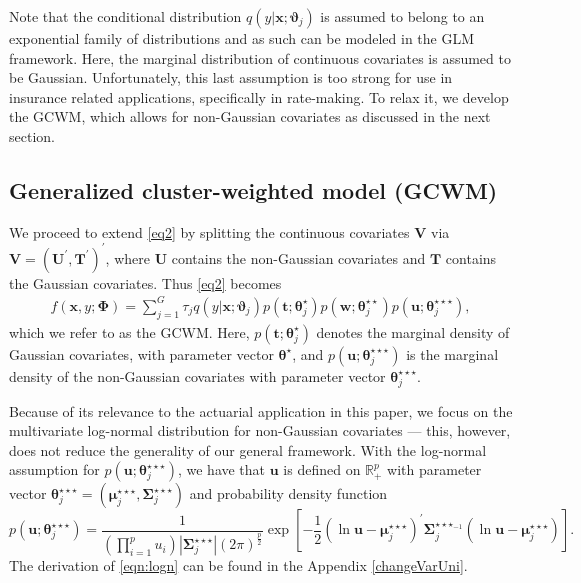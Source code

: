 \documentclass[11pt,letterpaper]{article}
\numberwithin{equation}{section}
\numberwithin{equation}{section}
\numberwithin{equation}{section}
\begin{document}
Note that the conditional distribution $q(y|\bm{x};\bm{\vartheta}_j)$ is assumed to belong to an exponential family of distributions and as such can be modeled in the GLM framework. Here, the marginal distribution of continuous covariates is assumed to be Gaussian. Unfortunately, this last assumption is too strong for use in insurance related applications, specifically in rate-making. To relax it, we develop the GCWM, which allows for non-Gaussian covariates as discussed in the next section.

\subsection{Generalized cluster-weighted model (GCWM) }
We proceed to extend \eqref{eq2} by splitting the continuous covariates $\bm{V}$ via $\bm{V}=(\bm U^{'}, \bm T^{'})^{'}$, where $\bm{U}$ contains the non-Gaussian covariates and $\bm{T}$ contains the Gaussian covariates. Thus \eqref{eq2} becomes
\begin{align}
 f(\bm x, y; \bm{\Phi})= \sum_{j=1}^{G} \tau_j q(y|\bm{x};\bm{\vartheta}_j)p(\bm{t};\bm{\theta}_j^{\star})p(\bm{w};\bm{\theta}_j^{\star\star})p(\bm{u};\bm{\theta}_j^{\star\star\star}),
\label{eq3}
\end{align}
which we refer to as the GCWM. Here, $p(\bm{t};\bm{\theta}_j^{\star})$ denotes the marginal density of Gaussian covariates, with parameter vector $\bm{\theta}^{\star}$, and $p(\bm{u};\bm{\theta}_j^{\star\star\star})$ is the marginal density of the non-Gaussian covariates with parameter vector $ \bm{ \theta}_j^{\star\star\star} $.


Because of its relevance to the actuarial application in this paper, we focus on the multivariate log-normal distribution  for non-Gaussian covariates --- this, however, does not reduce the generality of our general framework. With the log-normal assumption for $p(\bm{u};\bm{\theta}_j^{\star\star\star})$, we have that $\bm{u}$ is defined on $\mathbb{R}^p_+$ with parameter vector $\bm{\theta}_j^{\star\star\star}= (\bm{\mu}_j^{\star\star\star} ,\bm{\Sigma}_j^{\star\star\star})$ and probability density function
\begin{equation}\label{eqn:logn} 
p \left(  \bm{u}; \bm{\theta}_j^{\star\star\star} \right) = \frac{1}{(\prod_{i=1}^{p}u_{i})|\bm{ \Sigma}_j^{\star\star\star} |(2 \pi)^{\frac{p}{2}}}   \exp\left[-\frac{1}{2}(\ln\bm{ u}-\bm{\mu}_j^{\star\star\star})^{'}\bm{\Sigma}_j^{{\star\star\star}_{-1}}(\ln \bm {u}-\bm{\mu}_j^{\star\star\star})\right].
\end{equation} The derivation of \eqref{eqn:logn} can be found in the Appendix \ref{changeVarUni}.
\end{document}
